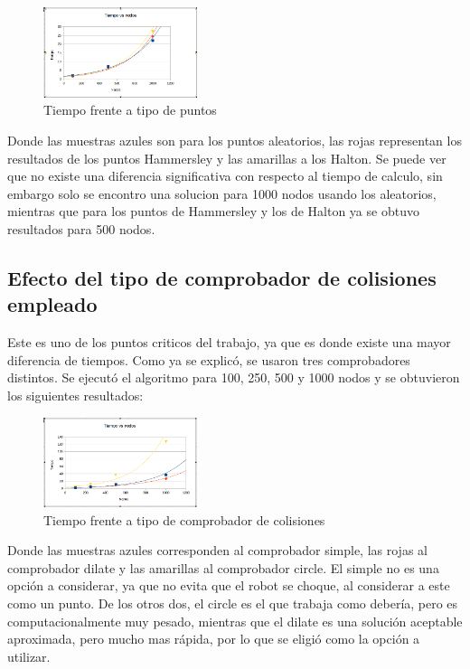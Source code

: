 \begin{figure}[H]
		\centering
        \includegraphics[width=0.4\textwidth]{images/t_vs_nodos_vs_tipo.png}
        \caption{Tiempo frente a tipo de puntos}
        \label{fig:t_vs_tipo}
\end{figure}

Donde las muestras azules son para los puntos aleatorios, las rojas representan los resultados de los puntos Hammersley y las amarillas a los Halton. Se puede ver que no existe una diferencia significativa con respecto al tiempo de calculo, sin embargo solo se encontro una solucion para 1000 nodos usando los aleatorios, mientras que para los puntos de Hammersley y los de Halton ya se obtuvo resultados para 500 nodos.

\subsection{Efecto del tipo de comprobador de colisiones empleado}

Este es uno de los puntos criticos del trabajo, ya que es donde existe una mayor diferencia de tiempos. Como ya se explicó, se usaron tres comprobadores distintos. Se ejecutó el algoritmo para 100, 250, 500 y 1000 nodos y se obtuvieron los siguientes resultados:\\ 

\begin{figure}[H]
		\centering
        \includegraphics[width=0.4\textwidth]{images/t_vs_nodos_vs_col.png}
        \caption{Tiempo frente a tipo de comprobador de colisiones}
        \label{fig:t_vs_col}
\end{figure}

Donde las muestras azules corresponden al comprobador simple, las rojas al comprobador dilate y las amarillas al comprobador circle. El simple no es una opción a considerar, ya que no evita que el robot se choque, al considerar a este como un punto. De los otros dos, el circle es el que trabaja como debería, pero es computacionalmente muy pesado, mientras que el dilate es una solución aceptable aproximada, pero mucho mas rápida, por lo que se eligió como la opción a utilizar.